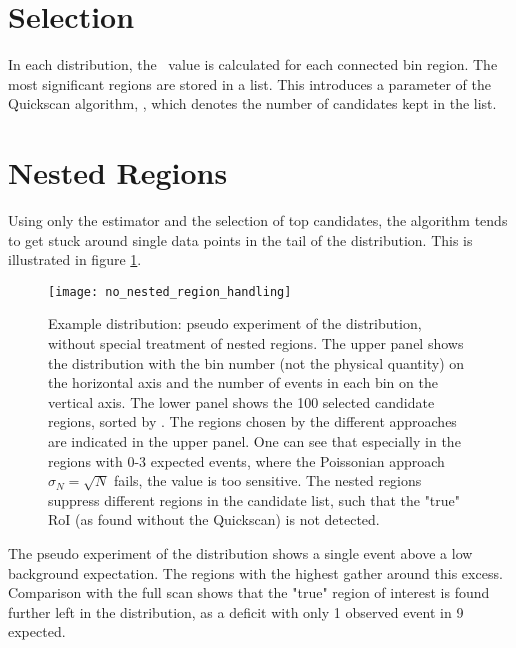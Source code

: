 \section{Selection}
In each distribution, the \mychi~value is calculated for each connected bin region. The most significant regions are stored in a list. This introduces a parameter of the Quickscan algorithm, \paramregions, which denotes the number of candidates kept in the list.

\section{Nested Regions}
Using only the estimator and the selection of top \paramregions candidates, the algorithm tends to get stuck around single data points in the tail of the distribution. This is illustrated in figure \ref{fig:no_nested_region_handling}. 
\begin{figure}[htbp]
	\centering
	\texttt{[image: no\_nested\_region\_handling]}
	\caption{Example distribution: pseudo experiment of the  \sumpT distribution, without special treatment of nested regions. The upper panel shows the distribution with the bin number (not the physical quantity) on the horizontal axis and the number of events in each bin on the vertical axis. The lower panel shows the 100 selected candidate regions, sorted by \mychi. The regions chosen by the different approaches are indicated in the upper panel. One can see that especially in the regions with 0-3 expected events, where the Poissonian approach $\sigma_N = \sqrt{N}$ fails, the \mychi value is too sensitive. The nested regions suppress different regions in the candidate list, such that the "true" RoI (as found without the Quickscan) is not detected.}
	\label{fig:no_nested_region_handling}
\end{figure}
The pseudo experiment of the  \sumpT distribution shows a single event above a low background expectation. The regions with the highest \mychi gather around this excess. Comparison with the full scan shows that the "true" region of interest is found further left in the distribution, as a deficit with only 1 observed event in 9 expected.

